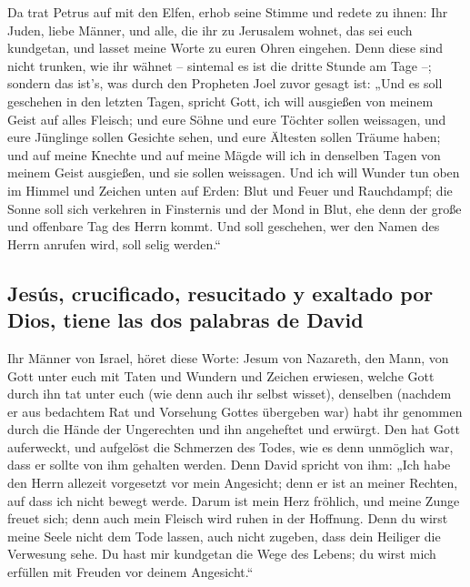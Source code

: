  Da trat Petrus auf mit den Elfen, erhob seine Stimme und
redete zu ihnen: Ihr Juden, liebe Männer, und alle, die ihr zu Jerusalem
wohnet, das sei euch kundgetan, und lasset meine Worte zu euren Ohren
eingehen.  Denn diese sind nicht trunken, wie ihr wähnet
-- sintemal es ist die dritte Stunde am Tage --;  sondern
das ist's, was durch den Propheten Joel zuvor gesagt ist:
 „Und es soll geschehen in den letzten Tagen, spricht
Gott, ich will ausgießen von meinem Geist auf alles Fleisch; und eure
Söhne und eure Töchter sollen weissagen, und eure Jünglinge sollen
Gesichte sehen, und eure Ältesten sollen Träume haben; 
und auf meine Knechte und auf meine Mägde will ich in denselben Tagen
von meinem Geist ausgießen, und sie sollen weissagen. 
Und ich will Wunder tun oben im Himmel und Zeichen unten auf Erden: Blut
und Feuer und Rauchdampf;  die Sonne soll sich verkehren
in Finsternis und der Mond in Blut, ehe denn der große und offenbare Tag
des Herrn kommt.  Und soll geschehen, wer den Namen des
Herrn anrufen wird, soll selig werden.``

\hypertarget{jesuxfas-crucificado-resucitado-y-exaltado-por-dios-tiene-las-dos-palabras-de-david}{%
\subsection{Jesús, crucificado, resucitado y exaltado por Dios, tiene
las dos palabras de
David}\label{jesuxfas-crucificado-resucitado-y-exaltado-por-dios-tiene-las-dos-palabras-de-david}}

 Ihr Männer von Israel, höret diese Worte: Jesum von
Nazareth, den Mann, von Gott unter euch mit Taten und Wundern und
Zeichen erwiesen, welche Gott durch ihn tat unter euch (wie denn auch
ihr selbst wisset),  denselben (nachdem er aus bedachtem
Rat und Vorsehung Gottes übergeben war) habt ihr genommen durch die
Hände der Ungerechten und ihn angeheftet und erwürgt. 
Den hat Gott auferweckt, und aufgelöst die Schmerzen des Todes, wie es
denn unmöglich war, dass er sollte von ihm gehalten werden.
 Denn David spricht von ihm: „Ich habe den Herrn allezeit
vorgesetzt vor mein Angesicht; denn er ist an meiner Rechten, auf dass
ich nicht bewegt werde.  Darum ist mein Herz fröhlich,
und meine Zunge freuet sich; denn auch mein Fleisch wird ruhen in der
Hoffnung.  Denn du wirst meine Seele nicht dem Tode
lassen, auch nicht zugeben, dass dein Heiliger die Verwesung sehe.
 Du hast mir kundgetan die Wege des Lebens; du wirst mich
erfüllen mit Freuden vor deinem Angesicht.``

